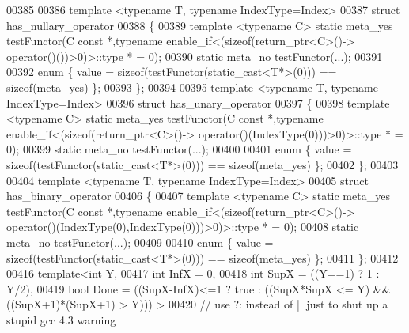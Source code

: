 \begin{DoxyCode}
00385 
00386 \textcolor{keyword}{template} <\textcolor{keyword}{typename} T, \textcolor{keyword}{typename} IndexType=Index>
00387 \textcolor{keyword}{struct }has\_nullary\_operator
00388 \{
00389   \textcolor{keyword}{template} <\textcolor{keyword}{typename} C> \textcolor{keyword}{static} meta\_yes testFunctor(C \textcolor{keyword}{const} *,\textcolor{keyword}{typename} enable\_if<(\textcolor{keyword}{sizeof}(return\_ptr<C>()->\textcolor{keyword}{
      operator}()())>0)>::type * = 0);
00390   \textcolor{keyword}{static} meta\_no testFunctor(...);
00391 
00392   \textcolor{keyword}{enum} \{ value = \textcolor{keyword}{sizeof}(testFunctor(static\_cast<T*>(0))) == \textcolor{keyword}{sizeof}(meta\_yes) \};
00393 \};
00394 
00395 \textcolor{keyword}{template} <\textcolor{keyword}{typename} T, \textcolor{keyword}{typename} IndexType=Index>
00396 \textcolor{keyword}{struct }has\_unary\_operator
00397 \{
00398   \textcolor{keyword}{template} <\textcolor{keyword}{typename} C> \textcolor{keyword}{static} meta\_yes testFunctor(C \textcolor{keyword}{const} *,\textcolor{keyword}{typename} enable\_if<(\textcolor{keyword}{sizeof}(return\_ptr<C>()->\textcolor{keyword}{
      operator}()(IndexType(0)))>0)>::type * = 0);
00399   \textcolor{keyword}{static} meta\_no testFunctor(...);
00400 
00401   \textcolor{keyword}{enum} \{ value = \textcolor{keyword}{sizeof}(testFunctor(static\_cast<T*>(0))) == \textcolor{keyword}{sizeof}(meta\_yes) \};
00402 \};
00403 
00404 \textcolor{keyword}{template} <\textcolor{keyword}{typename} T, \textcolor{keyword}{typename} IndexType=Index>
00405 \textcolor{keyword}{struct }has\_binary\_operator
00406 \{
00407   \textcolor{keyword}{template} <\textcolor{keyword}{typename} C> \textcolor{keyword}{static} meta\_yes testFunctor(C \textcolor{keyword}{const} *,\textcolor{keyword}{typename} enable\_if<(\textcolor{keyword}{sizeof}(return\_ptr<C>()->\textcolor{keyword}{
      operator}()(IndexType(0),IndexType(0)))>0)>::type * = 0);
00408   \textcolor{keyword}{static} meta\_no testFunctor(...);
00409 
00410   \textcolor{keyword}{enum} \{ value = \textcolor{keyword}{sizeof}(testFunctor(static\_cast<T*>(0))) == \textcolor{keyword}{sizeof}(meta\_yes) \};
00411 \};
00412 
00416 \textcolor{keyword}{template}<\textcolor{keywordtype}{int} Y,
00417          \textcolor{keywordtype}{int} InfX = 0,
00418          \textcolor{keywordtype}{int} SupX = ((Y==1) ? 1 : Y/2),
00419          \textcolor{keywordtype}{bool} Done = ((SupX-InfX)<=1 ? \textcolor{keyword}{true} : ((SupX*SupX <= Y) && ((SupX+1)*(SupX+1) > Y))) >
00420                                 \textcolor{comment}{// use ?: instead of || just to shut up a stupid gcc 4.3 warning}

\end{DoxyCode}
